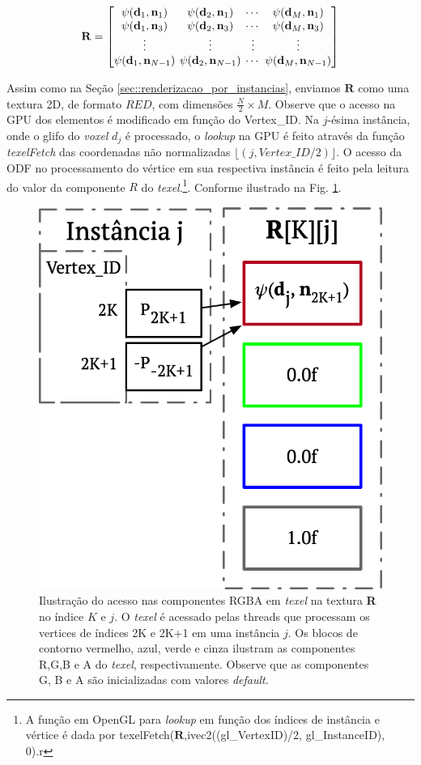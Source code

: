 \documentclass[
    12pt,                %
    oneside,            %
    a4paper,            %
    english,            %
    french,                %
    spanish,            %
    brazil                %
    ]{abntex2}
\begin{document}
\begin{equation}
\label{eq::odf_prototipo3}
\mathbf{R} = 
\begingroup %
\setlength\arraycolsep{2pt}
\begin{bmatrix} 
    \psi(\mathbf{d}_{1}, \mathbf{n}_1) &
    \psi(\mathbf{d}_{2}, \mathbf{n}_1) & \cdots & 
    \psi(\mathbf{d}_{M}, \mathbf{n}_1)  \\
    
    \psi(\mathbf{d}_{1}, \mathbf{n}_3) &
    \psi(\mathbf{d}_{2}, \mathbf{n}_3) & \cdots & 
    \psi(\mathbf{d}_{M}, \mathbf{n}_3) \\ \vdots & \vdots & \vdots & \vdots  \\
    
    \psi(\mathbf{d}_{1}, \mathbf{n}_{N-1}) & 
    \psi(\mathbf{d}_{2}, \mathbf{n}_{N-1}) & \cdots & 
    \psi(\mathbf{d}_{M}, \mathbf{n}_{N-1})
\end{bmatrix}
\endgroup
\end{equation}

Assim como na Seção \ref{sec::renderizacao_por_instancias}, enviamos $\mathbf{R}$ como uma textura 2D, de formato $RED$, com dimensões $\frac{N}{2}\times M$. Observe que o acesso na GPU dos elementos é modificado em função do Vertex\_ID. Na $j$-ésima instância, onde o glifo do \textit{voxel} $d_j$ é processado, o \textit{lookup} na GPU é feito através da função \textit{texelFetch} das coordenadas não normalizadas $\lfloor (j, Vertex\_ID/2)\rfloor$. O acesso da ODF no processamento do vértice em sua respectiva instância é feito pela leitura do valor da componente $R$ do \textit{texel}.\footnote{A função em OpenGL para \textit{lookup} em função dos índices de instância e vértice é dada por texelFetch($\mathbf{R}$,ivec2((gl\_VertexID)/2, gl\_InstanceID), 0).r}.  Conforme ilustrado na Fig. \ref{fig::texelfetch_prototipo3}.

\begin{figure}[htb]
    \centering
    \includegraphics[width=.35\linewidth, angle=0]{figs/Renderizacao_glifos_evolucao/texellookup_RED.png}
    \caption{Ilustração do acesso nas componentes RGBA em \textit{texel} na textura \textbf{R} no índice $K$ e $j$. O \textit{texel} é acessado pelas threads que processam os vertices de índices 2K e 2K+1 em uma instância $j$. Os blocos de contorno vermelho, azul, verde e cinza ilustram as componentes R,G,B e A do \textit{texel}, respectivamente. Observe que as componentes G, B e A são inicializadas com valores \textit{default}.}
    \label{fig::texelfetch_prototipo3}
\end{figure}
\end{document}
